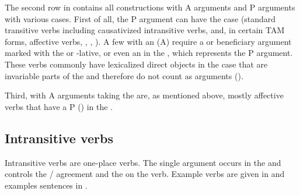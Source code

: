 The second row in  contains all constructions with  A arguments and P arguments with various cases. First of all, the P argument can have the  case (standard transitive verbs including causativized intransitive verbs, and, in certain TAM forms, affective verbs, , , ). A few  with an   (A) require a  or beneficiary argument marked with the  or -lative, or even an  in the  , which represents the P argument. These verbs commonly have lexicalized direct objects in the  case that are invariable parts of the  and therefore do not count as arguments ().

Third,  with A arguments taking the  are, as mentioned above, mostly affective verbs that have a P () in the . 



\subsection{Intransitive verbs}\label{sec:Intransitive verbs}
\largerpage

Intransitive verbs are one-place verbs. The single argument occurs in the  and controls the / agreement and the  on the verb. Example verbs are given in  and examples sentences in . 

